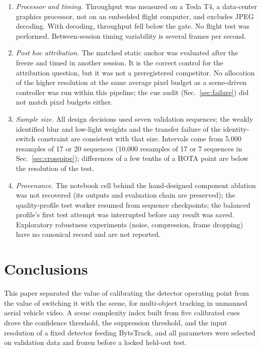 \documentclass[journal]{new-aiaa}
\begin{document}
\begin{enumerate}
\item \emph{Processor and timing.} Throughput was measured on a Tesla T4, a data-center graphics processor, not on an embedded flight computer, and excludes JPEG decoding. With decoding, throughput fell below the gate. No flight test was performed. Between-session timing variability is several frames per second.
\item \emph{Post hoc attribution.} The matched static anchor was evaluated after the freeze and timed in another session. It is the correct control for the attribution question, but it was not a preregistered competitor. No allocation of the higher resolution at the same average pixel budget as a scene-driven controller was run within this pipeline; the cue audit (Sec.~\ref{sec:failure}) did not match pixel budgets either.
\item \emph{Sample size.} All design decisions used seven validation sequences; the weakly identified blur and low-light weights and the transfer failure of the identity-switch constraint are consistent with that size. Intervals come from 5,000 resamples of 17 or 20 sequences (10,000 resamples of 17 or 7 sequences in Sec.~\ref{sec:crosspipe}); differences of a few tenths of a HOTA point are below the resolution of the test.
\item \emph{Provenance.} The notebook cell behind the hand-designed component ablation was not recovered (its outputs and evaluation chain are preserved); the quality-profile test worker resumed from sequence checkpoints; the balanced profile's first test attempt was interrupted before any result was saved. Exploratory robustness experiments (noise, compression, frame dropping) have no canonical record and are not reported.
\end{enumerate}

\section{Conclusions}\label{sec:conclusions}
This paper separated the value of calibrating the detector operating point from the value of switching it with the scene, for multi-object tracking in unmanned aerial vehicle video. A scene complexity index built from five calibrated cues drove the confidence threshold, the suppression threshold, and the input resolution of a fixed detector feeding ByteTrack, and all parameters were selected on validation data and frozen before a locked held-out test.
\end{document}
